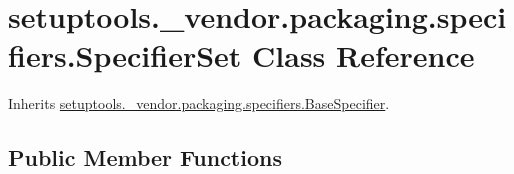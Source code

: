 \hypertarget{classsetuptools_1_1__vendor_1_1packaging_1_1specifiers_1_1_specifier_set}{}\section{setuptools.\+\_\+vendor.\+packaging.\+specifiers.\+Specifier\+Set Class Reference}
\label{classsetuptools_1_1__vendor_1_1packaging_1_1specifiers_1_1_specifier_set}


Inherits \hyperlink{classsetuptools_1_1__vendor_1_1packaging_1_1specifiers_1_1_base_specifier}{setuptools.\+\_\+vendor.\+packaging.\+specifiers.\+Base\+Specifier}.

\subsection*{Public Member Functions}
